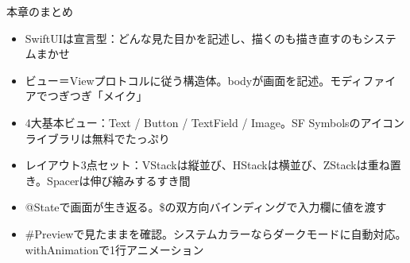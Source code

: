 \begin{tcbsummary}{本章のまとめ}
\begin{itemize}
  \item SwiftUIは宣言型：どんな見た目かを記述し、描くのも描き直すのもシステムまかせ
  \item ビュー＝Viewプロトコルに従う構造体。bodyが画面を記述。モディファイアでつぎつぎ「メイク」
  \item 4大基本ビュー：Text / Button / TextField / Image。SF Symbolsのアイコンライブラリは無料でたっぷり
  \item レイアウト3点セット：VStackは縦並び、HStackは横並び、ZStackは重ね置き。Spacerは伸び縮みするすき間
  \item @Stateで画面が生き返る。\$の双方向バインディングで入力欄に値を渡す
  \item \#Previewで見たままを確認。システムカラーならダークモードに自動対応。withAnimationで1行アニメーション
\end{itemize}

\end{tcbsummary}

